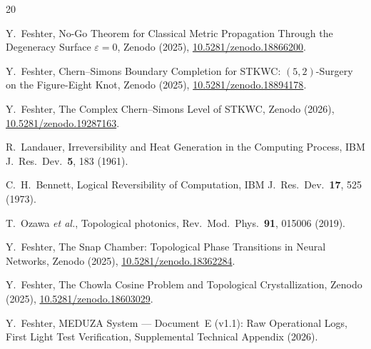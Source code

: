 \documentclass[reprint, aps, prl, amsmath, amssymb, floatfix]{revtex4-2}
\begin{document}
\begin{thebibliography}{20}

Y.~Feshter,
No-Go Theorem for Classical Metric Propagation Through the
Degeneracy Surface $\varepsilon = 0$,
Zenodo (2025),
\href{https://doi.org/10.5281/zenodo.18866200}{10.5281/zenodo.18866200}.

Y.~Feshter,
Chern--Simons Boundary Completion for STKWC: $(5,2)$-Surgery
on the Figure-Eight Knot,
Zenodo (2025),
\href{https://doi.org/10.5281/zenodo.18894178}{10.5281/zenodo.18894178}.

Y.~Feshter,
The Complex Chern--Simons Level of STKWC,
Zenodo (2026),
\href{https://doi.org/10.5281/zenodo.19287163}{10.5281/zenodo.19287163}.

R.~Landauer,
Irreversibility and Heat Generation in the Computing Process,
IBM J.\ Res.\ Dev.\ \textbf{5}, 183 (1961).

C.~H.~Bennett,
Logical Reversibility of Computation,
IBM J.\ Res.\ Dev.\ \textbf{17}, 525 (1973).

T.~Ozawa \emph{et al.},
Topological photonics,
Rev.\ Mod.\ Phys.\ \textbf{91}, 015006 (2019).

Y.~Feshter,
The Snap Chamber: Topological Phase Transitions in Neural Networks,
Zenodo (2025),
\href{https://doi.org/10.5281/zenodo.18362284}{10.5281/zenodo.18362284}.

Y.~Feshter,
The Chowla Cosine Problem and Topological Crystallization,
Zenodo (2025),
\href{https://doi.org/10.5281/zenodo.18603029}{10.5281/zenodo.18603029}.

Y.~Feshter,
MEDUZA System --- Document~E (v1.1): Raw Operational Logs,
First Light Test Verification,
Supplemental Technical Appendix (2026).

\end{thebibliography}
\end{document}
